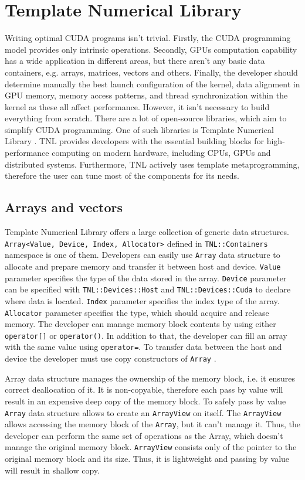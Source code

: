\chapter{Template Numerical Library}

Writing optimal CUDA programs isn't trivial.
Firstly, the CUDA programming model provides only intrinsic operations.
Secondly, GPUs computation capability has a wide application in different areas, but there aren't any basic data containers, e.g. arrays, matrices, vectors and others.
Finally, the developer should determine manually the best launch configuration of the kernel, data alignment in GPU memory, memory access patterns, and thread synchronization within the kernel as these all affect performance.
However, it isn't necessary to build everything from scratch.
There are a lot of open-source libraries, which aim to simplify CUDA programming.
One of such libraries is Template Numerical Library \cite{TNL}.
TNL provides developers with the essential building blocks for high-performance computing on modern hardware, including CPUs, GPUs and distributed systems.
Furthermore, TNL actively uses template metaprogramming, therefore the user can tune most of the components for its needs.

\section{Arrays and vectors}

Template Numerical Library offers a large collection of generic data structures.
\texttt{Array<Value, Device, Index, Allocator>} defined in \texttt{TNL::Containers} namespace is one of them.
Developers can easily use \texttt{Array} data structure to allocate and prepare memory and transfer it between host and device.
\texttt{Value} parameter specifies the type of the data stored in the array.
\texttt{Device} parameter can be specified with \texttt{TNL::Devices::Host} and \texttt{TNL::Devices::Cuda} to declare where data is located.
\texttt{Index} parameter specifies the index type of the array.
\texttt{Allocator} parameter specifies the type, which should acquire and release memory.
The developer can manage memory block contents by using either \texttt{operator[]} or \texttt{operator()}.
In addition to that, the developer can fill an array with the same value using \texttt{operator=}.
To transfer data between the host and device the developer must use copy constructors of \texttt{Array} \cite{TNLArray}.

Array data structure manages the ownership of the memory block, i.e. it ensures correct deallocation of it.
It is non-copyable, therefore each pass by value will result in an expensive deep copy of the memory block.
To safely pass by value \texttt{Array} data structure allows to create an \texttt{ArrayView} on itself.
The \texttt{ArrayView} allows accessing the memory block of the \texttt{Array}, but it can't manage it.
Thus, the developer can perform the same set of operations as the Array, which doesn't manage the original memory block.
\texttt{ArrayView} consists only of the pointer to the original memory block and its size.
Thus, it is lightweight and passing by value will result in shallow copy.


